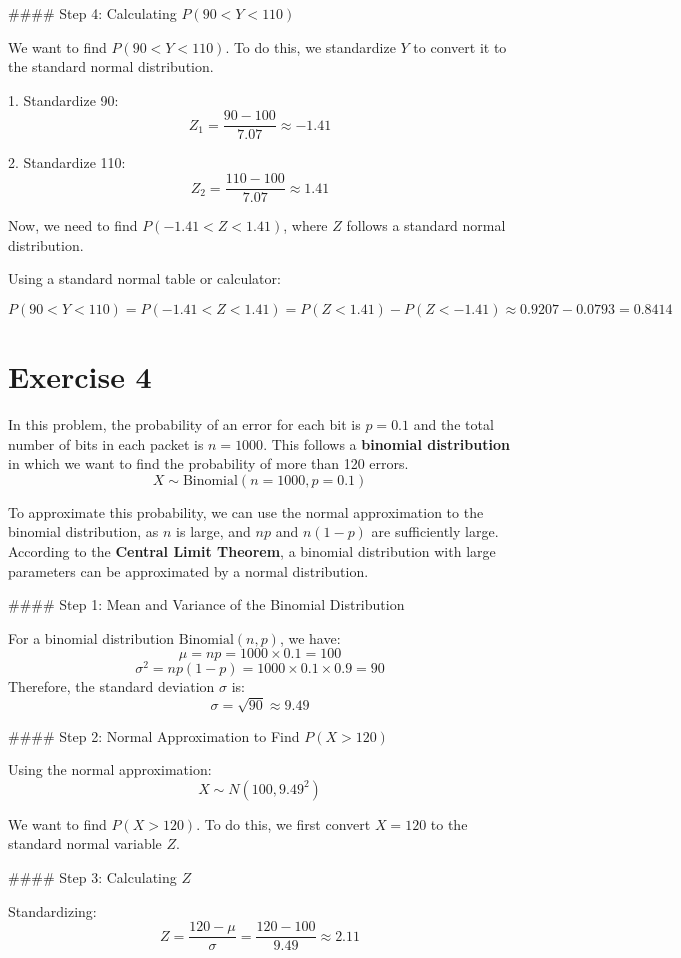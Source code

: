 \documentclass[a4paper,12pt]{article}
\begin{document}
#### Step 4: Calculating \( P(90 < Y < 110) \)

We want to find \( P(90 < Y < 110) \). To do this, we standardize \( Y \) to convert it to the standard normal distribution.

1. Standardize 90:
   \[
   Z_1 = \frac{90 - 100}{7.07} \approx -1.41
   \]

2. Standardize 110:
   \[
   Z_2 = \frac{110 - 100}{7.07} \approx 1.41
   \]

Now, we need to find \( P(-1.41 < Z < 1.41) \), where \( Z \) follows a standard normal distribution.

Using a standard normal table or calculator:

\[
    P(90 < Y < 110) = P(-1.41 < Z < 1.41) = P(Z < 1.41) - P(Z < -1.41) \approx 0.9207 - 0.0793 = 0.8414
\]

\newpage
\section{Exercise 4}
In this problem, the probability of an error for each bit is \( p = 0.1 \) and the total number of bits in each packet is \( n = 1000 \). This follows a \textbf{binomial distribution} in which we want to find the probability of more than 120 errors.
\[
X \sim \text{Binomial}(n = 1000, p = 0.1)
\]

To approximate this probability, we can use the normal approximation to the binomial distribution, as \( n \) is large, and \( np \) and \( n(1 - p) \) are sufficiently large. According to the \textbf{Central Limit Theorem}, a binomial distribution with large parameters can be approximated by a normal distribution.

#### Step 1: Mean and Variance of the Binomial Distribution

For a binomial distribution \( \text{Binomial}(n, p) \), we have:
\[
\mu = np = 1000 \times 0.1 = 100
\]
\[
\sigma^2 = np(1 - p) = 1000 \times 0.1 \times 0.9 = 90
\]
Therefore, the standard deviation \( \sigma \) is:
\[
\sigma = \sqrt{90} \approx 9.49
\]

#### Step 2: Normal Approximation to Find \( P(X > 120) \)

Using the normal approximation:
\[
X \sim N(100, 9.49^2)
\]

We want to find \( P(X > 120) \). To do this, we first convert \( X = 120 \) to the standard normal variable \( Z \).

#### Step 3: Calculating \( Z \)

Standardizing:
\[
Z = \frac{120 - \mu}{\sigma} = \frac{120 - 100}{9.49} \approx 2.11
\]
\end{document}
